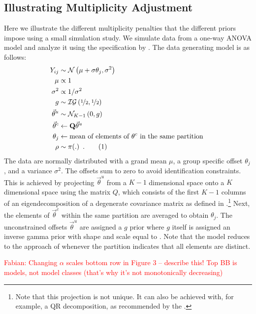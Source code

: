 \documentclass[11pt,a4paper]{article}
\theoremstyle{definition} %
\theoremstyle{case}
\newcommand{\numberthis}{\addtocounter{equation}{1}\tag{\theequation}}
\newcommand{\FD}[1]{\textcolor{red}{Fabian: #1 }}
\begin{document}
\subsection{Illustrating Multiplicity Adjustment} \label{sec:illustration}
Here we illustrate the different multiplicity penalties that the different priors impose using a small simulation study. We simulate data from a one-way ANOVA model and analyze it using the specification by \textcite{rouder2012default}. The data generating model is as follows:
\begin{align*}
    Y_{ij}              &\sim \mathcal{N}\left(\mu + \sigma\theta_j, \sigma^2\right)\\
    \mu                 &\propto 1  \\
    \sigma^2            &\propto 1 / \sigma^2 \\
    g                   &\sim \mathcal{IG}\left(\nicefrac{1}{2}, \nicefrac{1}{2}\right) \\
    \vec{\theta}^u   &\sim \mathcal{N}_{K-1}\left(0, g\right)   \\
    \vec{\theta}^c   &\leftarrow \mathbf{Q}\vec{\theta}^u \\
    \theta_j            &\leftarrow \text{mean of elements of } \theta^c \text{ in the same partition }\\
    \rho                &\sim \pi(.) \enspace . \numberthis
\end{align*}
The data are normally distributed with a grand mean $\mu$, a group specific offset $\theta_j$, and a variance $\sigma^2$. The offsets sum to zero to avoid identification constraints. This is achieved by projecting $\vec{\theta}^u$ from a $K-1$ dimensional space onto a $K$ dimensional space using the matrix $Q$, which consists of the first $K-1$ columns of an eigendecomposition of a degenerate covariance matrix as defined in \textcite{rouder2012default}.\footnote{Note that this projection is not unique. It can also be achieved with, for example, a QR decomposition, as recommended by the \textcite{stanUserManual}.} Next, the elements of $\vec{\theta}^c$ within the same partition are averaged to obtain $\theta_j$. The unconstrained offsets $\vec{\theta}^u$ are assigned a $g$ prior where $g$ itself is assigned an inverse gamma prior with shape and scale equal to  \parencite{liang2008mixtures}. Note that the model reduces to the approach of \textcite{rouder2012default} whenever the partition indicates that all elements are distinct.

\FD{Changing $\alpha$ scales bottom row in Figure 3 – describe this! Top BB is models, not model classes (that's why it's not monotonically decreasing)}
\end{document}
